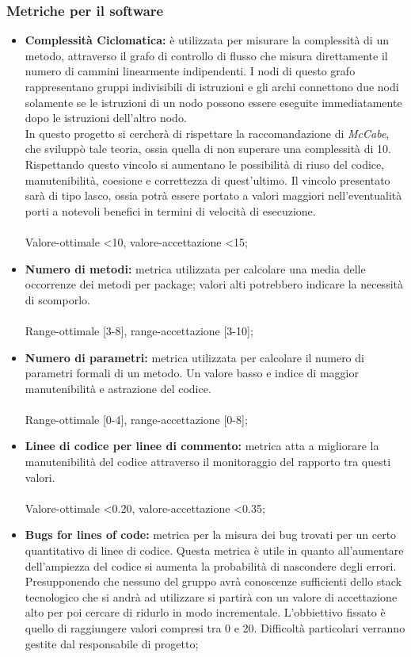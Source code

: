 		\subsubsection{Metriche per il software}
			\begin{itemize}
				\item \textbf{Complessità Ciclomatica:} è utilizzata per misurare la complessità di un metodo, attraverso il grafo di controllo di flusso che misura direttamente il numero di cammini linearmente indipendenti. I nodi di questo grafo rappresentano gruppi indivisibili di istruzioni e gli archi connettono due nodi solamente se le istruzioni di un nodo possono essere eseguite immediatamente dopo le istruzioni dell'altro nodo.\\
				In questo progetto si cercherà di rispettare la raccomandazione di \textit{McCabe}, che sviluppò tale teoria, ossia quella di non superare una complessità di 10. Rispettando questo vincolo si aumentano le possibilità di riuso del codice, manutenibilità, coesione e correttezza di quest'ultimo. Il vincolo presentato sarà di tipo lasco, ossia potrà essere portato a valori maggiori nell'eventualità porti a notevoli benefici in termini di velocità di esecuzione.\\ \\
				Valore-ottimale <10, valore-accettazione <15;
				\item \textbf{Numero di metodi:} metrica utilizzata per calcolare una media delle occorrenze dei metodi per package\gloss{}; valori alti potrebbero indicare la necessità di scomporlo.\\ \\ 					
				Range-ottimale [3-8], range-accettazione [3-10];
				\item \textbf{Numero di parametri:} metrica utilizzata per calcolare il numero di parametri formali di un metodo. Un valore basso e indice di maggior manutenibilità e astrazione del codice.\\ \\
				Range-ottimale [0-4], range-accettazione [0-8];
				\item \textbf{Linee di codice per linee di commento:} metrica atta a migliorare la manutenibilità del codice attraverso il monitoraggio del rapporto tra questi valori.\\ \\
				Valore-ottimale <0.20, valore-accettazione <0.35;
				\item \textbf{Bugs for lines of code:} metrica per la misura dei bug\gloss{} trovati per un certo quantitativo di linee di codice. Questa metrica è utile in quanto all'aumentare dell'ampiezza del codice si aumenta la probabilità di nascondere degli errori. Presupponendo che nessuno del gruppo avrà conoscenze sufficienti dello stack tecnologico che si andrà ad utilizzare si partirà con un valore di accettazione alto per poi cercare di ridurlo in modo incrementale. L'obbiettivo fissato è quello di raggiungere valori compresi tra 0 e 20. Difficoltà particolari verranno gestite dal responsabile di progetto;

\end{itemize}
